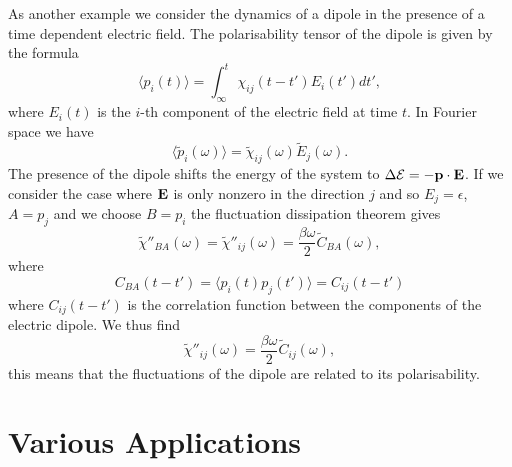 \documentclass[11pt]{report}
\begin{document}
As another example we consider the dynamics of a dipole in the presence of a time dependent electric field. The polarisability tensor  of the dipole is given by the formula
\begin{equation}
\langle p_i(t)\rangle =\int_{\infty}^t \chi_{ij}(t-t') E_i(t') dt',
\end{equation}
where $E_i(t)$ is the $i$-th component of the electric field at time $t$. In Fourier space we have
\begin{equation}
\langle \tilde p_i(\omega)\rangle  = \tilde \chi_{ij}(\omega)\tilde E_j(\omega).
\end{equation}
The presence of the dipole shifts the energy of the system to  $\Delta{\cal E} = -{\bf p}\cdot{\bf E}$. If we consider the case where  ${\bf E}$ is only nonzero in the direction $j$ and so $E_j=\epsilon $, $A=p_j $ and we choose $B= p_i$ the fluctuation dissipation theorem gives
\begin{equation}
\tilde \chi''_{BA}(\omega) = \tilde \chi''_{ij}(\omega)=\frac{\beta \omega}{2}\tilde C_{BA}(\omega),
\end{equation}
where 
\begin{equation}
C_{BA}(t-t')= \langle p_i(t)p_j(t')\rangle = C_{ij}(t-t')
\end{equation}
where $C_{ij}(t-t')$ 
is the correlation function between the components of the electric dipole. We thus find
\begin{equation}
\tilde \chi''_{ij}(\omega)=\frac{\beta \omega}{2}\tilde C_{ij}(\omega),
\end{equation}
this means that the fluctuations of the dipole are related to its polarisability.
\chapter{Various Applications}
\end{document}
